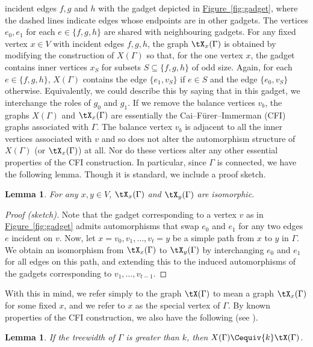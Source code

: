\documentclass[11pt]{article}
\newcommand{\expref}[2]{\texorpdfstring{\hyperref[#2]{#1~\ref{#2}}}{#1~\ref{#2}}}
\newtheorem{lemma}[theorem]{Lemma}
\begin{document}
incident edges $f,g$ and $h$ with the gadget depicted in
\expref{Figure}{fig:gadget}, where the dashed lines indicate edges whose endpoints
are in other gadgets. The vertices $e_0,e_1$ for each $e \in \{f,g,h\}$ are
shared with neighbouring gadgets.
For any fixed vertex $x \in V$ with incident edges $f,g,h$, the graph $\tX_x(\Gamma)$
is obtained by modifying the construction of $X(\Gamma)$ so that, for the one vertex
$x$, the gadget contains inner vertices $x_S$ for subsets $S \subseteq
\{f,g,h\}$ of odd size. Again, for each $e \in \{f,g,h\}$, $X(\Gamma)$ contains the
edge $\{e_1,v_S\}$ if $e \in S$ and the edge $\{e_0,v_S\}$ otherwise.  Equivalently, we could describe this by saying that in this gadget, we interchange the roles of $g_0$ and $g_1$.
If we remove the balance vertices $v_b$, the graphs $X(\Gamma)$ and $\tX_x(\Gamma)$ are
essentially the Cai--F\"{u}rer--Immerman (CFI) %
%
graphs associated with $\Gamma$. The
balance vertex $v_b$ is adjacent to all the inner vertices associated with $v$
and so does not alter the automorphism structure of $X(\Gamma)$ (or $\tX_x(\Gamma)$) at
all. Nor do these vertices alter any other essential properties of the CFI
construction. In particular, since $\Gamma$ is connected, we have the following
lemma. Though it is standard, we include a proof sketch.
\begin{lemma}\label{lem:v-irrelevant}
  For any $x,y \in V$, $\tX_x(\Gamma)$ and $\tX_y(\Gamma)$ are isomorphic.
\end{lemma}
\begin{proof}[Proof (sketch)]
  Note that the gadget corresponding to a vertex $v$ as in
  \expref{Figure}{fig:gadget} admits automorphisms that swap $e_0$ and $e_1$ for any
  two edges $e$ incident on $v$. Now, let $x=v_0,v_1,\ldots,v_t = y$ be a simple
  path from $x$ to $y$ in $\Gamma$. We obtain an isomorphism from $\tX_x(\Gamma)$ to
  $\tX_y(\Gamma)$ by interchanging $e_0$ and $e_1$ for all edges on this path, and
  extending this to the induced automorphisms of the gadgets corresponding to
  $v_1,\ldots,v_{t-1}$.
\end{proof}
With this in mind, we refer simply to the graph $\tX(\Gamma)$ to mean a graph
$\tX_x(\Gamma)$ for some fixed $x$, and we refer to $x$ as the special vertex of $\Gamma$.
By known properties of the CFI construction, we also have the following
(see \cite[Theorem~3]{DR07}).
\begin{lemma}\label{lem:cfi}
  If the treewidth of $\Gamma$ is greater than $k$, then $X(\Gamma) \Cequiv{k} \tX(\Gamma)$.
\end{lemma}
\end{document}
